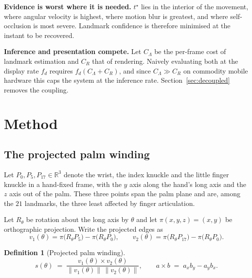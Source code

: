 \documentclass{article}
\theoremstyle{definition}
\newtheorem{definition}{Definition}
\begin{document}
\textbf{Evidence is worst where it is needed.} $t^\star$ lies in the interior of
the movement, where angular velocity is highest, where motion blur is greatest,
and where self-occlusion is most severe. Landmark confidence is therefore
minimised at the instant to be recovered.

\textbf{Inference and presentation compete.} Let $C_\Lambda$ be the per-frame
cost of landmark estimation and $C_R$ that of rendering. Naively evaluating both
at the display rate $f_d$ requires $f_d(C_\Lambda + C_R)$, and since
$C_\Lambda \gg C_R$ on commodity mobile hardware this caps the system at the
inference rate. Section~\ref{sec:decoupled} removes the coupling.

\section{Method}

\subsection{The projected palm winding}

Let $P_0, P_5, P_{17} \in \mathbb{R}^3$ denote the wrist, the index knuckle and
the little finger knuckle in a hand-fixed frame, with the $y$ axis along the
hand's long axis and the $z$ axis out of the palm. These three points span the
palm plane and are, among the $21$ landmarks, the three least affected by finger
articulation.

Let $R_\theta$ be rotation about the long axis by $\theta$ and let
$\pi(x, y, z) = (x, y)$ be orthographic projection. Write the projected edges as
\begin{equation}
  v_1(\theta) = \pi\big(R_\theta P_5\big) - \pi\big(R_\theta P_0\big),
  \qquad
  v_2(\theta) = \pi\big(R_\theta P_{17}\big) - \pi\big(R_\theta P_0\big).
\end{equation}

\begin{definition}[Projected palm winding]
\label{def:s}
\begin{equation}
  s(\theta) \;=\; \frac{v_1(\theta) \times v_2(\theta)}
                       {\lVert v_1(\theta) \rVert \, \lVert v_2(\theta) \rVert},
  \qquad
  a \times b \;=\; a_x b_y - a_y b_x .
\end{equation}
\end{definition}
\end{document}
